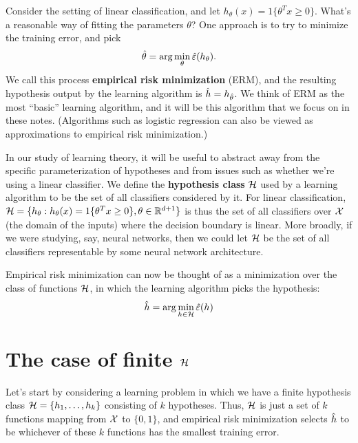 \documentclass{article} %
\renewcommand{\di}{d}
\begin{document}
Consider the setting of linear classification, and let $h_\theta(x) = 1\{\theta^Tx \geq 0\}$.
What's a reasonable way of fitting the parameters $\theta$?
One approach is to try to minimize the training error, and pick
\[
\hat\theta = \arg \min_\theta \hat\varepsilon(h_\theta).
\]
We call this process {\bf empirical risk minimization} (ERM), and the resulting
hypothesis output by the learning algorithm is $\hat{h} = h_{\hat\theta}$.
We think of ERM as the most ``basic'' learning algorithm, and it will be this
algorithm that we focus on in these notes.  (Algorithms such as logistic
regression can also be viewed as approximations to empirical risk minimization.)

In our study of learning theory, it will be useful to abstract away
from the specific parameterization of hypotheses and from issues such
as whether we're using a
linear classifier.  We define the {\bf hypothesis class} ${\cal H}$ used by a learning
algorithm to be the set of all classifiers considered by it. For linear
classification, $\calH = \{ h_\theta : h_\theta(x) = 1\{\theta^Tx\geq0\}, \theta \in \Re^{\di+1}\}$
is thus the set of all classifiers over ${\cal X}$
(the domain of the inputs)
where the decision boundary is linear.
More broadly, if we were studying, say, neural networks, then we could let ${\cal H}$ be
the set of all classifiers representable by some neural network architecture.

Empirical risk minimization can now be thought of as a minimization over the class
of functions ${\cal H}$, in which the learning algorithm picks the hypothesis:
\[
\hat{h} = \arg \min_{h \in {\cal H}} \hat\varepsilon(h)
\]

\section{The case of finite ${\cal H}$}

Let's start by considering a learning problem in which we have a finite hypothesis
class ${\cal H} = \{h_1, \ldots, h_k\}$ consisting of $k$ hypotheses.  Thus, ${\cal H}$
is just a set of $k$ functions mapping from ${\cal X}$
to
$\{0,1\}$, and empirical risk minimization selects $\hat{h}$ to be whichever of these $k$ functions
has the smallest training error.
\end{document}
